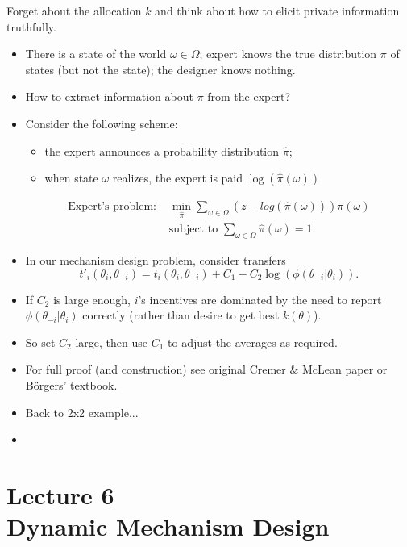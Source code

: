 \documentclass[english,handout]{beamer}		%
\def\lyxframeend{} %
\begin{document}
Forget about the allocation \(k\) and think about how to elicit private information truthfully.
\begin{example}
	\begin{itemize}
		\item There is a state of the world $\omega \in \Omega$; expert knows the true distribution $\pi$ of states (but not the state); the designer knows nothing.
		\item How to extract information about $\pi$ from the expert?
		\item Consider the following scheme:
		\begin{itemize}
			\item the expert announces a probability distribution $\hat{\pi}$;
			\item when state $\omega$ realizes, the expert is paid $\log(\hat{\pi}(\omega))$
		\end{itemize}
		{\footnotesize
		\begin{align*}
			\text{Expert's problem: } & \min_{\hat{\pi}}\sum_{\omega\in\Omega} \left(z-log(\hat{\pi}(\omega))\right) \pi(\omega)
			\\
			&\text{subject to } \sum_{\omega\in\Omega} \hat{\pi}(\omega)=1.
		\end{align*}
		\vspace{-1ex}
		}
	\end{itemize}
	\vspace{-1ex}
\end{example}
\vspace{-5ex}
\lyxframeend


\begin{itemize}
	\item In our mechanism design problem, consider transfers
	$$t'_i(\theta_i,\theta_{-i}) = t_i(\theta_i,\theta_{-i}) + C_1 - C_2 \log (\phi(\theta_{-i}|\theta_i)).$$
	\item If $C_2$ is large enough, $i$'s incentives are dominated by the need to report $\phi(\theta_{-i}|\theta_i)$ correctly (rather than desire to get best $k(\theta)$).
	\item So set $C_2$ large, then use $C_1$ to adjust the averages as required.
	\item For full proof (and construction) see original Cremer \& McLean paper or B{\"o}rgers' textbook.
\end{itemize}
\lyxframeend


\begin{itemize}
	\item Back to 2x2 example...
\end{itemize}
\lyxframeend


\begin{itemize}
	\item 
\end{itemize}
\lyxframeend




\section{Lecture 6 \\ Dynamic Mechanism Design}
\end{document}
